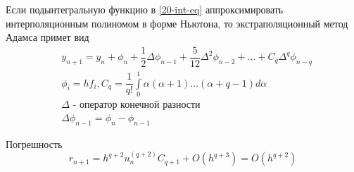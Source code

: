 Если подынтегральную функцию в \eqref{20-int-eq} аппроксимировать интерполяционным
полиномом в форме Ньютона, то экстраполяционный метод Адамса примет вид
\begin{equation}
  \begin{split}
    &y_{n + 1} = y_n + \phi_n + \dfrac{1}{2}\Delta \phi_{n - 1} +
    \dfrac{5}{12}\Delta^2\phi_{n - 2} + \ldots + C_q\Delta^q\phi_{n - q}\\
    &\phi_i = h f_i, C_q = \dfrac{1}{q!}\int\limits_0^1\alpha(\alpha + 1) \ldots
    (\alpha + q - 1)d\alpha\\
    &\Delta \text{ - оператор конечной разности}\\
    & \Delta \phi_{n - 1} = \phi_n - \phi_{n - 1}
  \end{split}
\end{equation}

Погрешность
\begin{equation}
  r_{n + 1} = h^{q + 2}u_n^{(q + 2)}C_{q + 1} + O(h^{q + 3}) = O(h^{q + 2})
\end{equation}
